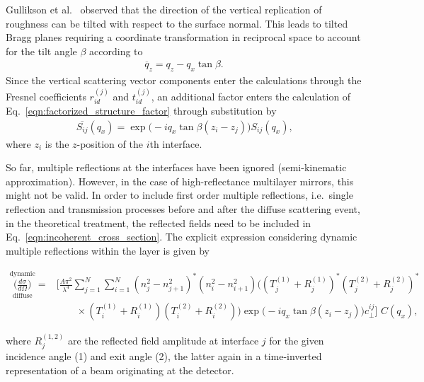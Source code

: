 Gullikson et al.~\cite{PhysRevB.59.13273} observed that the direction of the vertical replication of roughness can be tilted with respect to the surface normal. This leads to tilted Bragg planes requiring a coordinate transformation in reciprocal space to account for the tilt angle $\beta$ according to
\begin{align}
\overline{q}_z = q_z - q_x \tan \beta\text{.}
\end{align}
Since the vertical scattering vector components enter the calculations through the Fresnel coefficients $r_{id}^{(j)}$ and $t_{id}^{(j)}$, an additional factor enters the calculation of Eq.~\eqref{eqn:factorized_structure_factor} through substitution by
\begin{align}
\overline{S_{ij}}(q_x) = \exp\Big(-i q_x \tan \beta (z_i-z_j)\Big)  S_{ij}(q_x) \text{,} \label{eqn:tilt_correction}
\end{align}
where $z_i$ is the $z$-position of the $i$th interface.

So far, multiple reflections at the interfaces have been ignored (semi-kinematic approximation). However, in the case of high-reflectance multilayer mirrors, this might not be valid. In order to include first order multiple reflections, i.e.~single reflection and transmission processes before and after the diffuse scattering event, in the theoretical treatment, the reflected fields need to be included in Eq.~\eqref{eqn:incoherent_cross_section}. The explicit expression considering dynamic multiple reflections within the layer is given by

    \begin{align}
        \overset{\text{dynamic}}{\underset{\text{diffuse}}{\Big(\frac{d \sigma}{d \Omega}\Big)}} = &\Bigg[\frac{A \pi^2}{\lambda^4}\sum \limits_{j=1}^{N}\sum \limits_{i=1}^{N} (n_j^2 - n_{j+1}^2)^* (n_i^2 - n_{i+1}^2)\Big( (T^{(1)}_j + R^{(1)}_j)^* (T^{(2)}_j + R^{(2)}_j)^* \nonumber \\ &\qquad\times(T^{(1)}_i + R^{(1)}_i) (T^{(2)}_i + R^{(2)}_i) \Big) \exp\Big(-i q_x \tan \beta (z_i-z_j)\Big) c_\perp^{i j}\Bigg]\,\, C(q_x) \text{,} \label{eqn:multilayer_enhancement_factor}
    \end{align}

where $R^{(1,2)}_j$ are the reflected field amplitude at interface $j$ for the given incidence angle (1) and exit angle (2), the latter again in a time-inverted representation of a beam originating at the detector.


